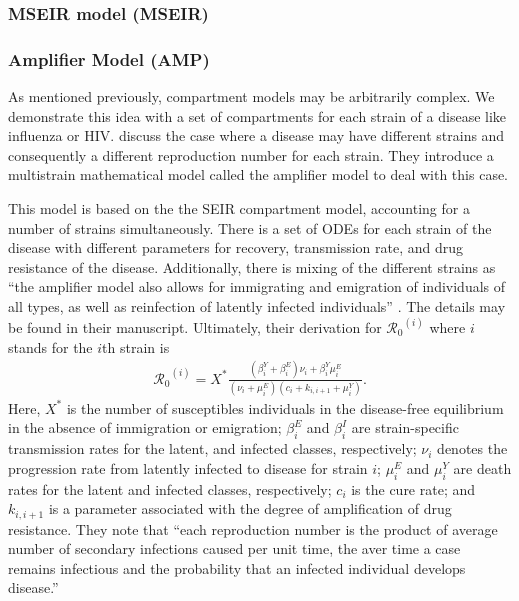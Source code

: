 \documentclass[12pt]{article}
\newcommand{\rr}{\ensuremath{\mathcal{R}_0}}
\begin{document}
\subsubsection{MSEIR model (MSEIR)}
\label{sec:mseir-model-mseir}






\subsubsection{Amplifier Model (AMP)}
As mentioned previously, compartment models may be arbitrarily complex.  We demonstrate this idea with a set of compartments for each strain of a disease like influenza or HIV.  \cite{blower2004} discuss the case where a disease may have different strains and consequently a different reproduction number for each strain.  They introduce a multistrain mathematical model called the amplifier model to deal with this case.

This model is based on the the SEIR compartment model, accounting for a number of strains simultaneously.  There is a set of ODEs for each strain of the disease with different parameters for recovery, transmission rate, and drug resistance of the disease.  Additionally, there is mixing of the different strains as ``the amplifier model also allows for immigrating and emigration of individuals of all types, as well as reinfection of latently infected individuals'' \citep{blower2004}.  The details may be found in their manuscript.  Ultimately, their derivation for $\rr^{(i)}$ where $i$ stands for the $i$th strain is
\begin{align*}
\rr^{(i)} = X^* \frac{ ( \beta_i^Y + \beta_i^E)\nu_i + \beta_i^Y \mu_i^E}{(\nu_i + \mu_i^E)(c_i + k_{i,i+1} + \mu_i^Y)}.
\end{align*}
Here, $X^*$ is the number of susceptibles individuals in the disease-free equilibrium in the absence of immigration or emigration; $\beta_i^E$ and $\beta_i^I$ are strain-specific transmission rates for the latent, and infected classes, respectively; $\nu_i$ denotes the progression rate from latently infected to disease for strain $i$; $\mu_i^E$ and $\mu_i^{Y}$ are death rates for the latent and infected classes, respectively; $c_i$ is the cure rate; and $k_{i, i+1}$ is a parameter associated with the degree of amplification of drug resistance.  They note that ``each reproduction number is the product of average number of secondary infections caused per unit time, the aver time a case remains infectious and the probability that an infected individual develops disease.''
\end{document}

